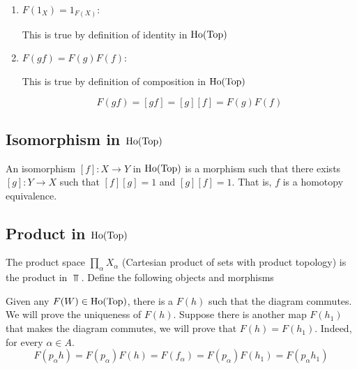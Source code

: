 \documentclass{article}
\begin{document}
\begin{longproof}

\begin{enumerate}
    \item $F(1_X) = 1_{F(X)}$:

    This is true by definition of identity in $\operatorname{Ho}(\operatorname{Top})$
    
    \item $F(gf) = F(g)F(f)$:

    This is true by definition of composition in $\operatorname{Ho}(\operatorname{Top})$

    $$
        F(gf) = [gf] = [g][f] = F(g) F(f)
    $$
\end{enumerate}    
\end{longproof}

\subsection{Isomorphism in $\operatorname{Ho}(\operatorname{Top})$}

An isomorphism $[f]: X \to Y$ in $\operatorname{Ho}(\operatorname{Top})$ is a morphism such that there exists $[g]: Y \to X$ such that $[f][g] = 1$ and $[g][f] = 1$. That is, $f$ is a homotopy equivalence.

\subsection{Product in $\operatorname{Ho}(\operatorname{Top})$}
The product space $\prod_{\alpha} X_\alpha$ (Cartesian product of sets with product topology) is the product in $\Top$. Define the following objects and morphisms

\begin{center}
\end{center}

Given any $F(W) \in \operatorname{Ho}(\operatorname{Top})$, there is a $F(h)$ such that the diagram commutes. We will prove the uniqueness of $F(h)$. Suppose there is another map $F(h_1)$ that makes the diagram commutes, we will prove that $F(h) = F(h_1)$. Indeed, for every $\alpha \in A$.
$$
    F(p_\alpha h) = F(p_\alpha) F(h) = F(f_\alpha) = F(p_\alpha) F(h_1) = F(p_\alpha h_1)
$$
\end{document}
